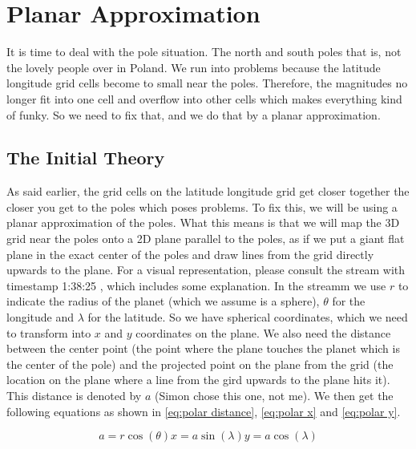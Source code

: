 \section{Planar Approximation}
It is time to deal with the pole situation. The north and south poles that is, not the lovely people over in Poland. We run into problems because the latitude longitude grid cells become to small 
near the poles. Therefore, the magnitudes no longer fit into one cell and overflow into other cells which makes everything kind of funky. So we need to fix that, and we do that by a planar 
approximation. 

\subsection{The Initial Theory}
As said earlier, the grid cells on the latitude longitude grid get closer together the closer you get to the poles which poses problems. To fix this, we will be using a planar approximation of 
the poles. What this means is that we will map the 3D grid near the poles onto a 2D plane parallel to the poles, as if we put a giant flat plane in the exact center of the poles and draw lines
from the grid directly upwards to the plane. For a visual representation, please consult the stream with timestamp 1:38:25 \cite{polarPlane}, which includes some explanation. In the streamm we
use $r$ to indicate the radius of the planet (which we assume is a sphere), $\theta$ for the longitude and $\lambda$ for the latitude. So we have spherical coordinates, which we need to transform
into $x$ and $y$ coordinates on the plane. We also need the distance between the center point (the point where the plane touches the planet which is the center of the pole) and the projected 
point on the plane from the grid (the location on the plane where a line from the gird upwards to the plane hits it). This distance is denoted by $a$ (Simon chose this one, not me). We then get 
the following equations as shown in \autoref{eq:polar distance}, \autoref{eq:polar x} and \autoref{eq:polar y}. 

\begin{subequations}
    \begin{equation}
        \label{eq:polar distance}
        a = r \cos(\theta)
    \end{equation}
    \begin{equation}
        \label{eq:polar x}
        x = a \sin(\lambda)
    \end{equation}
    \begin{equation}
        \label{eq:polar y}
        y = a \cos(\lambda)
    \end{equation}
\end{subequations}

